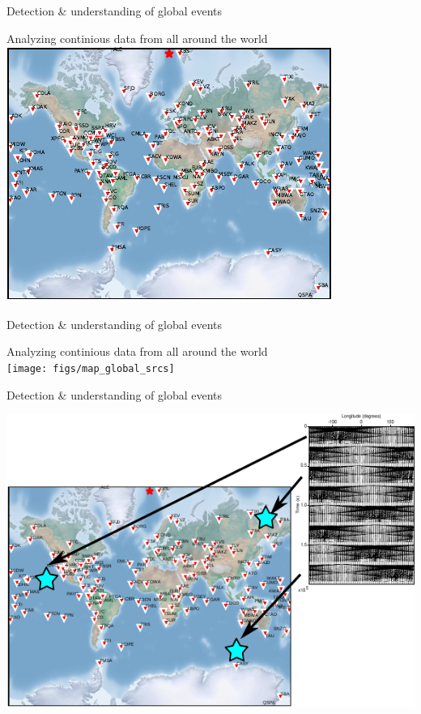 \documentclass[aspectratio=43,9pt]{beamer}
\begin{document}
\begin{frame}{Detection \& understanding of global events}

   \vskip -0.3cm
   \centering Analyzing continious data from all around the world \\
   \vskip 0.2cm
   \includegraphics[width=1\linewidth]{figs/map_global}

\end{frame}


\begin{frame}{Detection \& understanding of global events}

   \vskip -0.3cm
   \centering Analyzing continious data from all around the world \\
   \vskip 0.2cm
   \texttt{[image: figs/map\_global\_srcs]}

\end{frame}



\begin{frame}{Detection \& understanding of global events}

   \includegraphics[width=1\linewidth]{figs/map_global_detect}

\end{frame}
\end{document}
